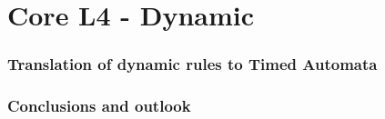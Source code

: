 \documentclass{beamer}
\begin{document}
\section{Core L4 - Dynamic}


\begin{frame}[fragile]\frametitle{Translation of dynamic rules to Timed Automata}



\end{frame}

\begin{frame}[fragile]\frametitle{Conclusions and outlook}




\end{frame}



\end{document}
